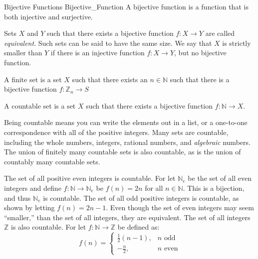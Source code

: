 \documentclass[crop=false,class=book,oneside]{standalone}
\begin{document}
                \begin{ldefinition}{Bijective Functions}
                      {Bijective_Function}
                    A \gls{bijective function} is a function
                    that is both injective and surjective.
                \end{ldefinition}
                Sets $X$ and $Y$ such that there
                exists a bijective function $f:X\rightarrow{Y}$ are
                called \textit{equivalent}. Such sets can be said
                to have the same size. We say that $X$ is strictly
                smaller than $Y$ if there is an injective function
                $f:X\rightarrow{Y}$, but no bijective function.
            \begin{definition}
                A finite set is a set $X$ such that there
                exists an $n\in\mathbb{N}$ such that there is
                a bijective function
                $f:\mathbb{Z}_{n}\rightarrow{S}$
            \end{definition}
            \begin{definition}
                A countable set is a set
                $X$ such that there exists a bijective
                function $f:\mathbb{N}\rightarrow{X}$.
            \end{definition}
            Being countable means you can write
            the elements out in a list, or a
            one-to-one correspondence with all of
            the positive integers. Many sets are countable,
            including the whole numbers, integers, rational
            numbers, and \textit{algebraic} numbers. The
            union of finitely many countable sets is also
            countable, as is the union of countably many
            countable sets.
            \begin{example}
                The set of all positive even integers is
                countable. For let $\mathbb{N}_{e}$ be the
                set of all even integers and define
                $f:\mathbb{N}\rightarrow\mathbb{N}_{e}$ be
                $f(n)=2n$ for all $n\in\mathbb{N}$. This is
                a bijection, and thus $\mathbb{N}_{e}$ is
                countable. The set of all odd positive integers
                is countable, as shown by letting
                $f(n)=2n-1$. Even though the set of even
                integers may seem ``smaller,'' than the set of
                all integers, they are equivalent. The set of
                all integers $\mathbb{Z}$ is also countable.
                For let $f:\mathbb{N}\rightarrow\mathbb{Z}$
                be defined as:
                \begin{equation}
                    f(n)=
                    \begin{cases}
                        \frac{1}{2}(n-1),&n\textrm{ odd}\\
                        -\frac{n}{2},&n\textrm{ even}
                    \end{cases}
                \end{equation}
            \end{example}
\end{document}
